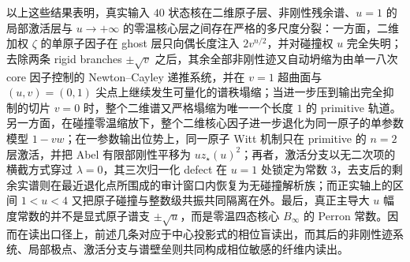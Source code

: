 \noindent
以上这些结果表明，真实输入 \(40\) 状态核在二维原子层、非刚性残余谱、\(u=1\) 的局部激活层与 \(u\to+\infty\) 的零温核心层之间存在严格的多尺度分裂：一方面，二维加权 \(\zeta\) 的单原子因子在 ghost 层只向偶长度注入 \(2v^{n/2}\)，并对碰撞权 \(u\) 完全失明；去除两条 rigid branches \(\pm\sqrt v\) 之后，其余全部非刚性迹又自动坍缩为由单一八次 core 因子控制的 Newton--Cayley 递推系统，并在 \(v=1\) 超曲面与 \((u,v)=(0,1)\) 尖点上继续发生可量化的谱秩塌缩；当进一步压到输出完全抑制的切片 \(v=0\) 时，整个二维谱又严格塌缩为唯一一个长度 \(1\) 的 primitive 轨道。另一方面，在碰撞零温缩放下，整个二维核心因子进一步退化为同一原子的单参数模型 \(1-vw\)；在一参数输出位势上，同一原子 Witt 机制只在 primitive 的 \(n=2\) 层激活，并把 Abel 有限部刚性平移为 \(u z_\star(u)^2\)；再者，激活分支以无二次项的横截方式穿过 \(\lambda=0\)，其三次归一化 defect 在 \(u=1\) 处锁定为常数 \(3\)，去支后的剩余实谱则在最近退化点所围成的审计窗口内恢复为无碰撞解析族；而正实轴上的区间 \(1<u<4\) 又把原子碰撞与整数级共振共同隔离在外。最后，真正主导大 \(u\) 幅度常数的并不是显式原子谱支 \(\pm\sqrt u\)，而是零温四态核心 \(B_\infty\) 的 Perron 常数。因而在读出口径上，前述几条对应于中心投影式的相位盲读出，而其后的非刚性迹系统、局部极点、激活分支与谱壁垒则共同构成相位敏感的纤维内读出。



\endinput
